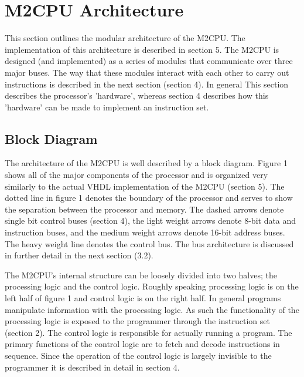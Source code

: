 \documentclass[a4paper,12pt]{article}
\newcommand{\mt}{M2CPU}
\begin{document}
\newpage
\section{\mt{} Architecture}
This section outlines the modular architecture of the \mt{}. The implementation
of this architecture is described in section 5. The \mt{} is designed (and 
implemented) as a series of modules that communicate over three major buses. 
The way that these modules interact with each other to carry out instructions is
described in the next section (section 4). In general This section describes the 
processor's 'hardware', whereas section 4 describes how this 'hardware' can be 
made to implement an instruction set.
\par

\subsection{Block Diagram}
The architecture of the \mt{} is well described by a block diagram. Figure 1
shows all of the major components of the processor and is organized very 
similarly to the actual VHDL implementation of the \mt{} (section 5). The 
dotted line in figure 1 denotes the boundary of the processor and serves to 
show the separation between the processor and memory. The dashed arrows denote
single bit control buses (section 4), the light weight arrows denote 8-bit data
and instruction buses, and the medium weight arrows denote 16-bit address buses. 
The heavy weight line denotes the control bus. The bus architecture is 
discussed in further detail in the next section (3.2).
\par

The \mt{}'s internal structure can be loosely divided into two halves; the
processing logic and the control logic. Roughly speaking processing logic is on
the left half of figure 1 and control logic is on the right half. In general 
programs manipulate information with the processing logic. As such the 
functionality of the processing logic is exposed to the programmer through the
instruction set (section 2). The control logic is responsible for actually 
running a program. The primary functions of the control logic are to fetch and 
decode instructions in sequence. Since the operation of the control logic is 
largely invisible to the programmer it is described in detail in section 4.
\par
\end{document}
